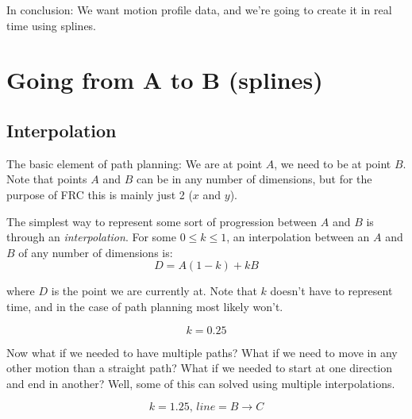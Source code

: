 \documentclass[12pt, english]{article}
\begin{document}
\par
In conclusion: We want motion profile data, and we're going to create it in real time using splines.


\pagebreak

\section{Going from A to B (splines)}
\subsection{Interpolation}
The basic element of path planning: We are at point $A$, we need to be at point $B$. Note that points $A$ and $B$ can be in any number of dimensions, but for the purpose of FRC this is mainly just 2 ($x$ and $y$). \\\par
The  simplest way to represent some sort of progression between $A$ and $B$ is through an \textit{interpolation}. For some $0 \leq k \leq 1$, an interpolation between an $A$ and $B$ of any number of dimensions is:
\[ D = A(1-k) + kB \]

\par
where $D$ is the point we are currently at. Note that $k$ doesn't have to represent time, and in the case of path planning most likely won't. 

\begin{center}
	\[ k = 0.25 \]
\end{center}

\par
Now what if we needed to have multiple paths? What if we need to move in any other motion than a straight path? What if we needed to start at one direction and end in another? Well, some of this can solved using multiple interpolations.

\begin{center}
	\[ k = 1.25,\,line=B \to C \]
\end{center}
\end{document}
